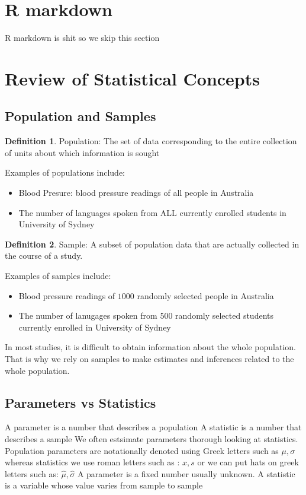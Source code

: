 \documentclass[twoside]{article}
\theoremstyle{definition}
\theoremstyle{definition}
\newtheorem*{proof1}{Definition}
\newenvironment{ddef}{\begin{dBox}\begin{proof1}}{\hfill{\scriptsize}\end{proof1}\end{dBox}}
\begin{document}
\section{R markdown}
R markdown is shit so we skip this section
\section{Review of Statistical Concepts}
\subsection{Population and Samples}
\begin{ddef}
  Population: The set of data corresponding to the entire collection of units about which information is sought 
\end{ddef}
Examples of populations include: 
\begin{itemize}
\item Blood Presure: blood pressure readings of all people in Australia
\item The number of languages spoken from ALL currently enrolled students in University of Sydney
\end{itemize}
\begin{ddef}
Sample: A subset of population data that are actually collected in the course of a study.
\end{ddef}
Examples of samples include:
\begin{itemize}
\item Blood pressure readings of $1000$ randomly selected people in Australia
\item The number of lanugages spoken from $500$ randomly selected students currently enrolled in University of Sydney
\end{itemize}
In most studies, it is difficult to obtain information about the
whole population. That is why we rely on samples to make
estimates and inferences related to the whole population.
\subsection{Parameters vs Statistics}
A parameter is a number that describes a population
A statistic is a number that describes a sample
We often estsimate parameters thorough looking at statistics. Population parameters are notationally denoted using Greek letters such as $\mu, \sigma$ whereas statistics we use roman letters such as : $x ,s$ or we can put hats on greek letters such as: 
$\hat{\mu}, \hat{\sigma}$
A parameter is a fixed number usually unknown. A statistic is a variable whose value varies from sample to sample
\end{document}
